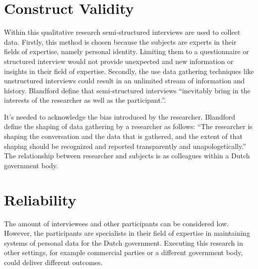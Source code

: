 \section{Construct Validity}
Within this qualitative research semi-structured interviews are used to collect data. Firstly, this method is chosen because the subjects are experts in their fields of expertise, namely personal identity. Limiting them to a questionnaire or structured interview would not provide unexpected and new information or insights in their field of expertise. Secondly, the use data gathering techniques like unstructured interviews could result in an unlimited stream of information and history. Blandford \etal \cite{Blandford2016QualitativeHR} define that semi-structured interviews “inevitably bring in the interests of the researcher as well as the participant.”. 
\par
It’s needed to acknowledge the bias introduced by the researcher. Blandford \etal \cite{Blandford2016QualitativeHR} define the shaping of data gathering by a researcher as follows: “The researcher is shaping the conversation and the data that is gathered, and the extent of that shaping should be recognized and reported transparently and unapologetically.” The relationship between researcher and subjects is as colleagues within a Dutch government body.
\section{Reliability}
The amount of interviewees and other participants can be considered low. However, the participants are specialists in their field of expertise in maintaining systems of personal data for the Dutch government. Executing this research in other settings, for example commercial parties or a different government body, could deliver different outcomes. 

